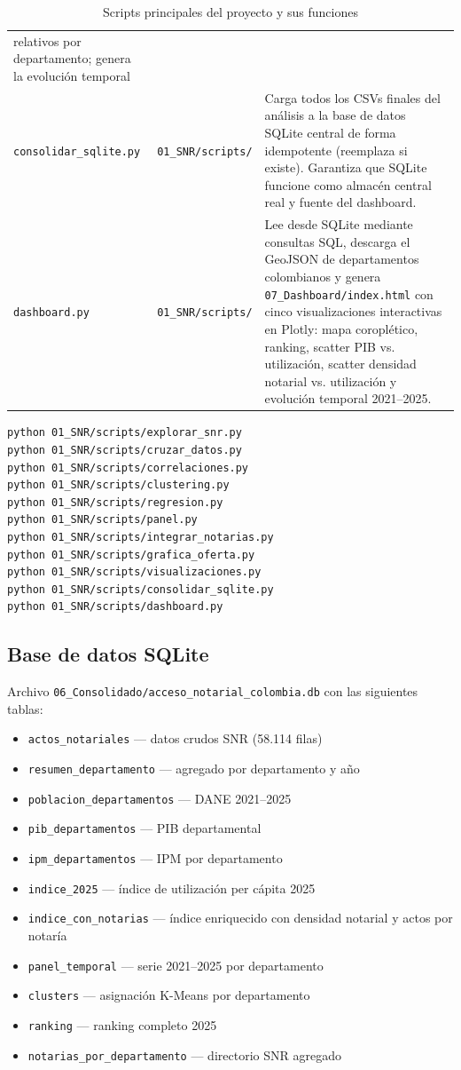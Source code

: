 \documentclass{article}
\begin{document}
\begin{table}[H]
\begin{tabular}{llp{6cm}}
relativos por departamento; genera la evolución temporal \\
\addlinespace
\texttt{consolidar\_sqlite.py} & \texttt{01\_SNR/scripts/} & Carga
todos los CSVs finales del análisis a la base de datos SQLite central
de forma idempotente (reemplaza si existe). Garantiza que SQLite
funcione como almacén central real y fuente del dashboard. \\
\addlinespace
\texttt{dashboard.py} & \texttt{01\_SNR/scripts/} & Lee desde SQLite
mediante consultas SQL, descarga el GeoJSON de departamentos
colombianos y genera \texttt{07\_Dashboard/index.html} con cinco
visualizaciones interactivas en Plotly: mapa coroplético, ranking,
scatter PIB vs. utilización, scatter densidad notarial vs. utilización
y evolución temporal 2021--2025. \\
\bottomrule
\end{tabular}
\caption{Scripts principales del proyecto y sus funciones}
\end{table}

\begin{verbatim}
python 01_SNR/scripts/explorar_snr.py
python 01_SNR/scripts/cruzar_datos.py
python 01_SNR/scripts/correlaciones.py
python 01_SNR/scripts/clustering.py
python 01_SNR/scripts/regresion.py
python 01_SNR/scripts/panel.py
python 01_SNR/scripts/integrar_notarias.py
python 01_SNR/scripts/grafica_oferta.py
python 01_SNR/scripts/visualizaciones.py
python 01_SNR/scripts/consolidar_sqlite.py
python 01_SNR/scripts/dashboard.py
\end{verbatim}

\subsection{Base de datos SQLite}

Archivo \texttt{06\_Consolidado/acceso\_notarial\_colombia.db} 
con las siguientes tablas:

\begin{itemize}
    \item \texttt{actos\_notariales} — datos crudos SNR (58.114 filas)
    \item \texttt{resumen\_departamento} — agregado por departamento y año
    \item \texttt{poblacion\_departamentos} — DANE 2021--2025
    \item \texttt{pib\_departamentos} — PIB departamental
    \item \texttt{ipm\_departamentos} — IPM por departamento
    \item \texttt{indice\_2025} — índice de utilización per cápita 2025
    \item \texttt{indice\_con\_notarias} — índice enriquecido con
    densidad notarial y actos por notaría
    \item \texttt{panel\_temporal} — serie 2021--2025 por departamento
    \item \texttt{clusters} — asignación K-Means por departamento
    \item \texttt{ranking} — ranking completo 2025
    \item \texttt{notarias\_por\_departamento} — directorio SNR agregado
\end{itemize}
\end{document}
